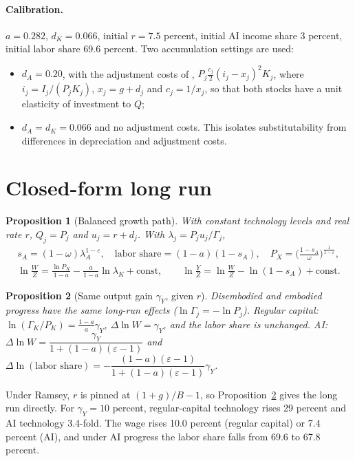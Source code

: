 \documentclass[11pt]{article}
\newtheorem{proposition}{Proposition}
\newcommand{\e}{\varepsilon}
\begin{document}
\paragraph{Calibration.} $a=0.282$, $d_K=0.066$, initial $r=7.5$ percent, initial AI
income share 3 percent, initial labor share 69.6 percent. Two accumulation settings are
used:
\begin{itemize}
\item[(A)] $d_A=0.20$, with the adjustment costs of \citet{kiley2004},
$P_j\tfrac{c_j}{2}(i_j-x_j)^2K_j$, where $i_j=I_j/(P_jK_j)$, $x_j=g+d_j$ and $c_j=1/x_j$, so that
both stocks have a unit elasticity of investment to $Q$;
\item[(B)] $d_A=d_K=0.066$ and no adjustment costs. This isolates substitutability from
differences in depreciation and adjustment costs.
\end{itemize}

\section{Closed-form long run}

\begin{proposition}[Balanced growth path]\label{prop:bgp}
With constant technology levels and real rate $r$, $Q_j=P_j$ and $u_j=r+d_j$. With
$\lambda_j=P_ju_j/\Gamma_j$,
\begin{gather*}
s_A=(1-\omega)\lambda_A^{1-\e},\quad
\text{labor share}=(1-a)(1-s_A),\quad
P_X=\Big(\frac{1-s_A}{\omega}\Big)^{\frac1{1-\e}},\\
\ln\frac WZ=\frac{\ln P_X}{1-a}-\frac{a}{1-a}\ln\lambda_K+\text{const},\qquad
\ln\frac YZ=\ln\frac WZ-\ln(1-s_A)+\text{const}.
\end{gather*}
\end{proposition}

\begin{proposition}[Same output gain $\gamma_Y$, given $r$]\label{prop:lr}
Disembodied and embodied progress have the same long-run effects ($\ln\Gamma_j=-\ln P_j$).
\emph{Regular capital}: $\ln(\Gamma_K/P_K)=\frac{1-a}{a}\gamma_Y$, $\Delta\ln W=\gamma_Y$, and the labor share is unchanged.
\emph{AI}: $\Delta\ln W=\dfrac{\gamma_Y}{1+(1-a)(\e-1)}$ and
$\Delta\ln(\text{labor share})=-\dfrac{(1-a)(\e-1)}{1+(1-a)(\e-1)}\gamma_Y$.
\end{proposition}
Under Ramsey, $r$ is pinned at $(1+g)/B-1$, so Proposition~\ref{prop:lr} gives the long run
directly. For $\gamma_Y=10$ percent, regular-capital technology rises 29 percent and AI
technology 3.4-fold. The wage rises 10.0 percent (regular capital) or 7.4 percent (AI), and
under AI progress the labor share falls from 69.6 to 67.8 percent.
\end{document}
